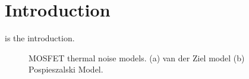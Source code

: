%
%

\chapter{Introduction}
\label{chap:intro}

 is the introduction.

\cite{abidi:ieee_ted86}
\cite{cheng:em}
\cite{mesh:book}
\cite{biber:mtt_s98}
\cite{atn:np5b}

\begin{figure}[t]
        \centering
        \hspace{0.10\linewidth}
        \caption{MOSFET thermal noise models.
                (a) van der Ziel model
                (b) Pospieszalski Model.}
        \label{F:goo:noise_model1}
\end{figure}
